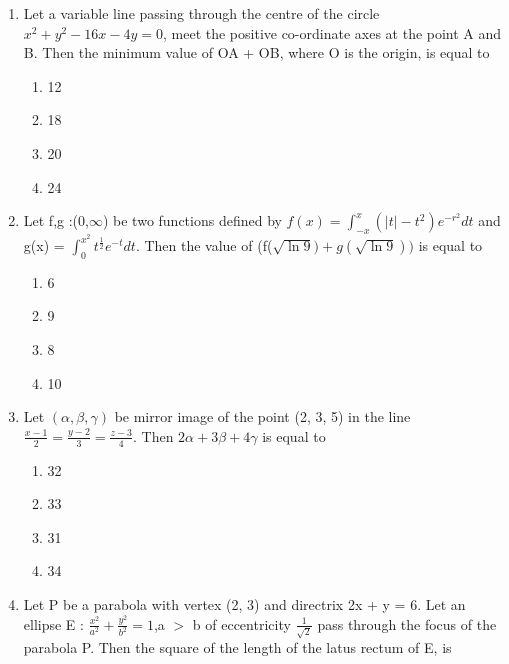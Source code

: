 \documentclass[journal]{IEEEtran}
\numberwithin{equation}{enumi}
\numberwithin{figure}{enumi}
\begin{document}
\begin{enumerate}
    \item Let a variable line passing through the centre of the circle $x^2  + y^2 - 16x - 4y = 0$, meet the positive co-ordinate axes at the point A and B. Then the minimum value of OA + OB, where O is the origin, is equal to
    \begin{multicols}{4}
    \begin{enumerate}
        \item 12
        \item 18
        \item 20
        \item 24
    \end{enumerate} 
    \end{multicols}
    \bigskip
    \item Let f,g :(0,$\infty$) be two functions defined by $f(x) = \int_{-x}^{x}(|t| - t^2)e^{-r^{2}}dt$ and g(x) = $\int_{0}^{x^2}t^{\frac{1}{2}}e^{-t}dt$. Then the value of (f($\sqrt{\ln9}) + g(\sqrt{\ln9}))$ is equal to
    \begin{multicols}{4}
    \begin{enumerate}
        \item 6
        \item 9
        \item 8
        \item 10
    \end{enumerate} 
    \end{multicols}
    \bigskip
    \item Let $(\alpha,\beta,\gamma)$  be mirror image of the point (2, 3, 5) in the line $\frac{x - 1}{2} = \frac{y - 2}{3} = \frac{z - 3}{4}$. Then $2\alpha + 3\beta + 4\gamma$ is equal to
    \begin{multicols}{4}
    \begin{enumerate}
        \item 32
        \item 33
        \item 31
        \item 34
    \end{enumerate} 
    \end{multicols}
    \bigskip
    \item Let P be a parabola with vertex (2, 3) and directrix 2x + y = 6. Let an ellipse E : $\frac{x^2}{a^2} + \frac{y^2}{b^2} = 1$,a $>$ b of eccentricity $\frac{1}{\sqrt{2}}$ pass through the focus of the parabola P. Then the square of the length of the latus rectum of E, is  
    \begin{multicols}{4}

\end{multicols}
\end{enumerate}
\end{document}

